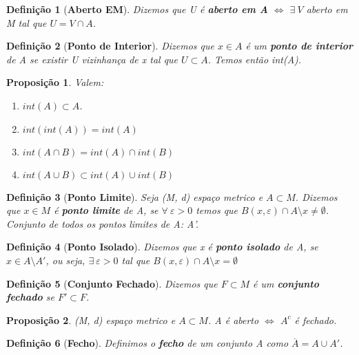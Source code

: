 \documentclass{article}
\newtheorem*{definition}{Definição}
\newtheorem*{proposicao}{Proposição}
\begin{document}
\begin{definition}[\textbf{Aberto EM}]
    Dizemos que U é \textbf{aberto em A} $\Leftrightarrow$ $\exists \: V$ aberto em M tal que $U = V \cap A$.
\end{definition}

\begin{definition}[\textbf{Ponto de Interior}]
    Dizemos que $x \in A$ é um \textbf{ponto de interior} de A se existir U vizinhança de x tal que $U \subset A$.
    Temos então int(A).
\end{definition}

\begin{proposicao}
    Valem:
    \begin{enumerate}
        \item $int(A) \subset A$.
        \item $int(int(A)) = int(A)$
        \item $int(A \cap B) = int(A) \cap int(B)$
        \item $int(A \cup B) \subset int(A) \cup int(B)$
    \end{enumerate}
\end{proposicao}

\begin{definition}[\textbf{Ponto Limite}]
    Seja (M, d) espaço metrico e $A \subset M$. Dizemos que $x \in M$ é \textbf{ponto limite} de A, se $\forall \: \varepsilon > 0$ temos que
    $B(x, \varepsilon) \cap A \setminus {x} \neq \emptyset $. Conjunto de todos os pontos limites de A: A'.
\end{definition}

\begin{definition}[\textbf{Ponto Isolado}]
    Dizemos que x é \textbf{ponto isolado} de A, se $x \in A \setminus A'$, ou seja, $\exists \: \varepsilon > 0$ tal que 
    $B(x, \varepsilon) \cap A \setminus {x} = \emptyset $
\end{definition}

\begin{definition}[\textbf{Conjunto Fechado}]
    Dizemos que $F \subset M$ é um \textbf{conjunto fechado} se $F' \subset F$.
\end{definition}

\begin{proposicao}
    (M, d) espaço metrico e $A \subset M$. A é aberto $\Leftrightarrow$ $A^c$ é fechado.
\end{proposicao}

\begin{definition}[\textbf{Fecho}]
    Definimos o \textbf{fecho} de um conjunto A como $\overline{A} = A \cup A'$.
\end{definition}
\end{document}
